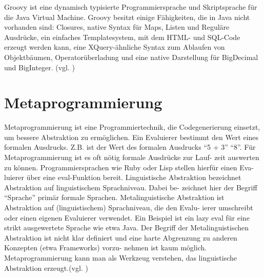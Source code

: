 \documentclass[11pt,english,ngerman, headsepline]{scrreprt}
\begin{document}
Groovy ist eine dynamisch typisierte Programmiersprache und Skriptsprache für
die Java Virtual Machine.
Groovy besitzt einige Fähigkeiten, die in Java nicht vorhanden sind: Closures,
native Syntax für Maps, Listen und Reguläre Ausdrücke, ein einfaches
Templatesystem, mit dem HTML- und SQL-Code erzeugt werden kann, eine
XQuery-ähnliche Syntax zum Ablaufen von Objektbäumen, Operatorüberladung und
eine native Darstellung für BigDecimal und BigInteger. (vgl. \cite{wikigroovy})



\section{Metaprogrammierung}\label{metaprogrammingLabel}

Metaprogrammierung ist eine Programmiertechnik, die Codegenerierung einsetzt, um
bessere Abstraktion zu ermöglichen.
Ein Evaluierer bestimmt den Wert eines formalen Ausdrucks. Z.B. ist der Wert des
formalen Ausdrucks “5 + 3” “8”. Für Metaprogrammierung ist es oft nötig
formale Ausdrücke zur Lauf- zeit auswerten zu können. Programmiersprachen wie
Ruby oder Lisp stellen hierfür einen Eva- luierer über eine eval-Funktion
bereit.
Linguistische Abstraktion bezeichnet Abstraktion auf linguistischem
Sprachniveau. Dabei be- zeichnet hier der Begriff “Sprache” primär formale
Sprachen.
Metalinguistische Abstraktion ist Abstraktion auf (linguistischem) Sprachniveau,
die den Evalu- ierer umschreibt oder einen eigenen Evaluierer verwendet. Ein
Beispiel ist ein lazy eval für eine strikt ausgewertete Sprache wie etwa Java.
Der Begriff der Metalinguistischen Abstraktion ist nicht klar definiert und eine
harte Abgrenzung zu anderen Konzepten (etwa Frameworks) vorzu- nehmen ist kaum
möglich.
Metaprogrammierung kann man als Werkzeug verstehen, das linguistische
Abstraktion erzeugt.(vgl. \cite{biekermetaprogrammierung})
\end{document}
